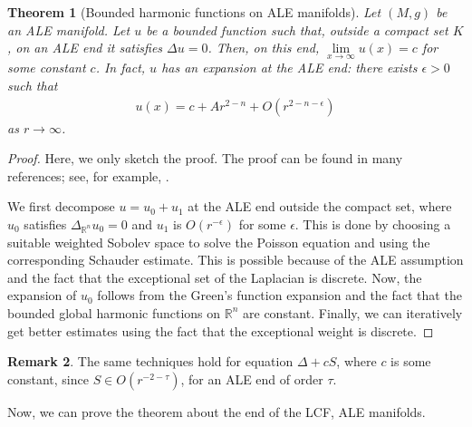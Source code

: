 \documentclass[12pt]{amsart}
\newtheorem{theorem}{Theorem}[section]
\theoremstyle{definition}
\newtheorem{remark}[theorem]{Remark}
\begin{document}
\begin{theorem}[Bounded harmonic functions on ALE manifolds]\label{harmonic on ALE}
    Let $(M,g)$ be an ALE manifold. Let $u$ be a bounded function such that, outside a compact set $K$, on an ALE end it satisfies $\Delta u = 0$. Then, on this end, $\lim\limits_{x\to\infty} u(x) = c$ for some constant $c$. In fact, $u$ has an expansion at the ALE end: there exists $\epsilon>0$ such that
    \begin{align*}
        u(x) = c + A r^{2-n} +O(r^{2-n-\epsilon})
    \end{align*}
    as $r\to\infty$.
\end{theorem}
\begin{proof}
    Here, we only sketch the proof. The proof can be found in many references; see, for example, \cite{DK}.

    We first decompose $u = u_0 + u_1$ at the ALE end outside the compact set, where $u_0$ satisfies $\Delta_{\mathbb{R}^n} u_0 = 0$ and $u_1$ is $O(r^{-\epsilon})$ for some $\epsilon$. This is done by choosing a suitable weighted Sobolev space to solve the Poisson equation and using the corresponding Schauder estimate. This is possible because of the ALE assumption and the fact that the exceptional set of the Laplacian is discrete. Now, the expansion of $u_0$ follows from the Green's function expansion and the fact that the bounded global harmonic functions on $\mathbb{R}^n$ are constant. Finally, we can iteratively get better estimates using the fact that the exceptional weight is discrete.
\end{proof}

\begin{remark}
    The same techniques hold for equation $\Delta + c S$, where $c$ is some constant, since $S\in O(r^{-2-\tau})$, for an ALE end of order $\tau$.
\end{remark}

Now, we can prove the theorem about the end of the LCF, ALE manifolds.
\end{document}
